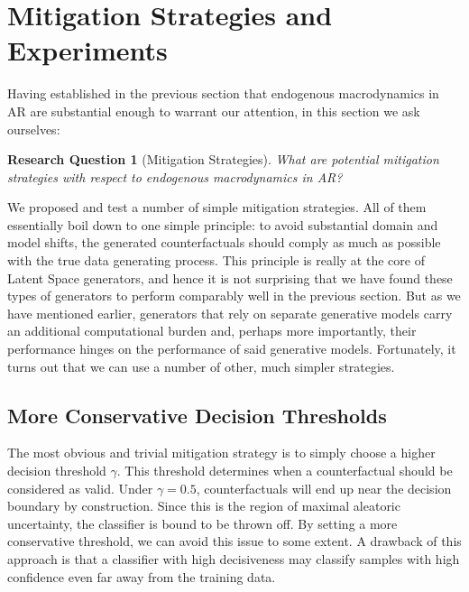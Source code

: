 \documentclass[conference,final,]{IEEEtran}
\newtheorem{proposition}{Research Question}[section]
\theoremstyle{definition}
\theoremstyle{definition}
\theoremstyle{definition}
\theoremstyle{definition}
\theoremstyle{remark}
\begin{document}
\hypertarget{mitigate}{%
\section{Mitigation Strategies and Experiments}\label{mitigate}}

Having established in the previous section that endogenous macrodynamics in AR are substantial enough to warrant our attention, in this section we ask ourselves:

\begin{proposition}[Mitigation Strategies]
\protect\hypertarget{prp:mitigate}{}\label{prp:mitigate}What are potential mitigation strategies with respect to endogenous macrodynamics in AR?
\end{proposition}

We proposed and test a number of simple mitigation strategies. All of them essentially boil down to one simple principle: to avoid substantial domain and model shifts, the generated counterfactuals should comply as much as possible with the true data generating process. This principle is really at the core of Latent Space generators, and hence it is not surprising that we have found these types of generators to perform comparably well in the previous section. But as we have mentioned earlier, generators that rely on separate generative models carry an additional computational burden and, perhaps more importantly, their performance hinges on the performance of said generative models. Fortunately, it turns out that we can use a number of other, much simpler strategies.

\hypertarget{more-conservative-decision-thresholds}{%
\subsection{More Conservative Decision Thresholds}\label{more-conservative-decision-thresholds}}

The most obvious and trivial mitigation strategy is to simply choose a higher decision threshold \(\gamma\). This threshold determines when a counterfactual should be considered as valid. Under \(\gamma=0.5\), counterfactuals will end up near the decision boundary by construction. Since this is the region of maximal aleatoric uncertainty, the classifier is bound to be thrown off. By setting a more conservative threshold, we can avoid this issue to some extent. A drawback of this approach is that a classifier with high decisiveness may classify samples with high confidence even far away from the training data.
\end{document}
